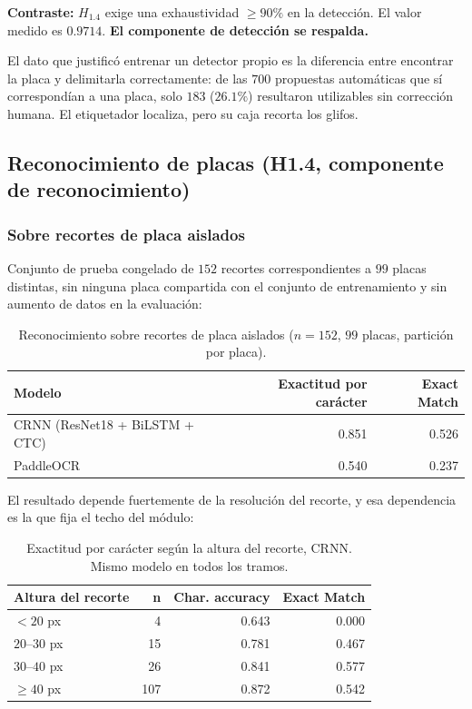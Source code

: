 \textbf{Contraste:} $H_{1{.}4}$ exige una exhaustividad $\geq 90\%$ en la detección.
El valor medido es $0{.}9714$. \textbf{El componente de detección se respalda.}

El dato que justificó entrenar un detector propio es la diferencia entre
encontrar la placa y delimitarla correctamente: de las $700$ propuestas
automáticas que sí correspondían a una placa, solo $183$ ($26{.}1\%$) resultaron
utilizables sin corrección humana. El etiquetador localiza, pero su caja recorta
los glifos.

\subsection{Reconocimiento de placas (H1.4, componente de reconocimiento)}
\label{sec:resultados_ocr}

\subsubsection{Sobre recortes de placa aislados}

Conjunto de prueba congelado de $152$ recortes correspondientes a $99$ placas
distintas, sin ninguna placa compartida con el conjunto de entrenamiento y sin
aumento de datos en la evaluación:

\begin{table}[H]
    \centering
    \caption{Reconocimiento sobre recortes de placa aislados ($n = 152$,
    $99$ placas, partición por placa).}
    \begin{tabular}{lrr}
        \toprule
        \textbf{Modelo} & \textbf{Exactitud por carácter} & \textbf{Exact Match} \\
        \midrule
        CRNN (ResNet18 + BiLSTM + CTC) & 0.851 & 0.526 \\
        PaddleOCR                      & 0.540 & 0.237 \\
        \bottomrule
    \end{tabular}
\end{table}

El resultado depende fuertemente de la resolución del recorte, y esa dependencia es
la que fija el techo del módulo:

\begin{table}[H]
    \centering
    \caption{Exactitud por carácter según la altura del recorte, CRNN.
    Mismo modelo en todos los tramos.}
    \begin{tabular}{lrrr}
        \toprule
        \textbf{Altura del recorte} & \textbf{n} & \textbf{Char. accuracy} & \textbf{Exact Match} \\
        \midrule
        $< 20$ px      &   4 & 0.643 & 0.000 \\
        $20$--$30$ px  &  15 & 0.781 & 0.467 \\
        $30$--$40$ px  &  26 & 0.841 & 0.577 \\
        $\geq 40$ px   & 107 & 0.872 & 0.542 \\
        \bottomrule
    \end{tabular}
\end{table}

